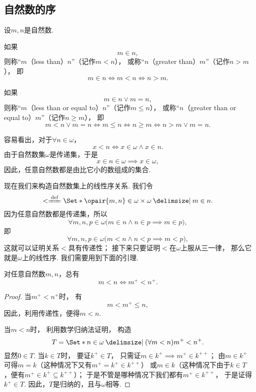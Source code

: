 \subsection{自然数的序}
\begin{definition}
设\(m,n\)是自然数.

如果\[
	m \in n,
\]
则称“\(m\)（less than）\(n\)”（记作\(m < n\)），
或称“\(n\)（greater than）\(m\)”（记作\(n > m\)），
即\[
	m \in n
	\iff m < n
	\iff n > m.
\]

如果\[
	m \in n \lor m = n,
\]
则称“\(m\)（less than or equal to）\(n\)”（记作\(m \leqslant n\)），
或称“\(n\)（greater than or equal to）\(m\)”（记作\(n \geqslant m\)），
即\[
	m < n \lor m = n
	\iff m \leqslant n
	\iff n \geqslant m
	\iff n > m \lor m = n.
\]
\end{definition}

容易看出，对于\(\forall n\in\omega\)，\[
	x < n
	\iff
	x \in \omega \land x \in n.
\]
由于自然数集\(\omega\)是传递集，于是\[
	x \in n \in \omega \implies x \in \omega,
\]
因此，任意自然数都是由比它小的数组成的集合.

现在我们来构造自然数集上的线性序关系.
我们令\[
	< \defeq \Set*{
		\opair{m,n} \in \omega \times \omega
		\given
		m \in n
	}.
\]
因为任意自然数都是传递集，所以\[
	\forall m,n,p \in \omega \bigl(
		m \in n \land n \in p
		\implies
		m \in p
	\bigr),
\]
即\[
	\forall m,n,p \in \omega \bigl(
		m < n \land n < p
		\implies
		m < p
	\bigr),
\]
这就可以证明关系\(<\)具有传递性；
接下来只要证明\(<\)在\(\omega\)上服从三一律，
那么它就是\(\omega\)上的线性序.
我们需要用到下面的引理.

\begin{lemma}\label{theorem:集合论.自然数的线性序.引理1}
对任意自然数\(m,n\)，总有\[
	m < n
	\iff
	m^+ < n^+.
\]
\begin{proof}
当\(m^+ < n^+\)时，
有\[
	m < m^+ \leqslant n,
\]
因此，利用传递性，便得\(m < n\).

当\(m < n\)时，
利用数学归纳法证明，
构造\[
	T = \Set*{
		n \in \omega
		\given
		(\forall m < n)
		m^+ < n^+
	}.
\]
显然\(0 \in T\).
当\(k \in T\)时，
要证\(k^+ \in T\)，
只需证\(m \in k^+ \implies m^+ \in k^{++}\)；
由\(m \in k^+\)可得\(m = k\)（这种情况下又有\(m^+ = k^+ \in k^{++}\)）
或\(m \in k\)（这种情况下由于\(k \in T\)，便有\(m^+ \in k^+ \subseteq k^{++}\)）；
于是不管是哪种情况下我们都有\(m^+ \in k^{++}\)，
于是证得\(k^+ \in T\).
因此，\(T\)是归纳的，且与\(\omega\)相等.
\end{proof}
\end{lemma}

